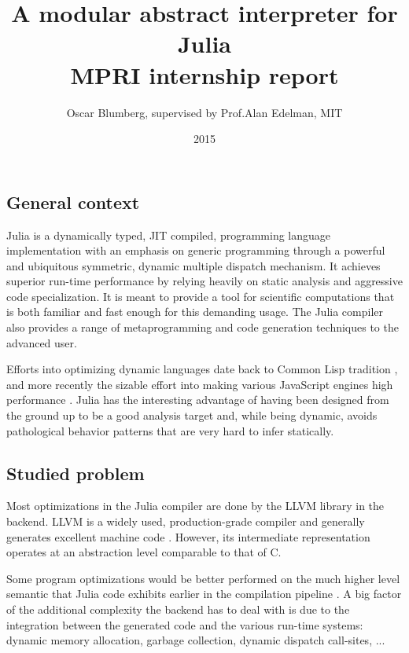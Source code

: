 \documentclass[11pt]{article}
\title{\vspace{-6ex}A modular abstract interpreter for Julia \\ MPRI internship report}
\author{Oscar Blumberg, supervised by Prof.\@ Alan Edelman, MIT}
\date{2015}
\begin{document}
\onehalfspacing
\maketitle

\thispagestyle{empty}
\vspace{1.5ex}
\subsection*{General context}

Julia\cite{julia-paper,julia-web} is a dynamically typed, JIT compiled, programming language implementation with an emphasis on generic programming through a powerful and ubiquitous symmetric, dynamic multiple dispatch mechanism. It achieves superior run-time performance by relying heavily on static analysis and aggressive code specialization. It is meant to provide a tool for scientific computations that is both familiar and fast enough for this demanding usage. The Julia compiler also provides a range of metaprogramming and code generation techniques to the advanced user.

Efforts into optimizing dynamic languages date back to Common Lisp tradition , and more recently the sizable effort into making various JavaScript engines high performance . Julia has the interesting advantage of having been designed from the ground up to be a good analysis target and, while being dynamic, avoids pathological behavior patterns that are very hard to infer statically.

\subsection*{Studied problem}

Most optimizations in the Julia compiler are done by the LLVM library in the backend. LLVM is a widely used, production-grade compiler and generally generates excellent machine code . However, its intermediate representation operates at an abstraction level comparable to that of C.

Some program optimizations would be better performed on the much higher level semantic that Julia code exhibits earlier in the compilation pipeline . A big factor of the additional complexity the backend has to deal with is due to the integration between the generated code and the various run-time systems: dynamic memory allocation, garbage collection, dynamic dispatch call-sites, ...
\end{document}
